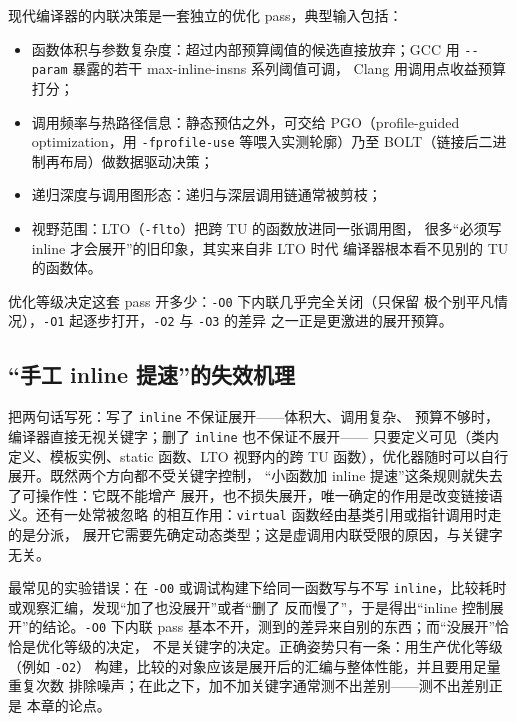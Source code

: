 \documentclass[12pt,a4paper,fontset=fandol]{ctexbook}
\newcommand{\Tp}[1]{\texttt{#1}}
\newcommand{\Opt}[1]{\texttt{-\/-#1}}
\begin{document}
现代编译器的内联决策是一套独立的优化 pass，典型输入包括：
\begin{itemize}
  \item 函数体积与参数复杂度：超过内部预算阈值的候选直接放弃；GCC
        用 \Opt{param} 暴露的若干 max-inline-insns 系列阈值可调，
        Clang 用调用点收益预算打分；
  \item 调用频率与热路径信息：静态预估之外，可交给 PGO（profile-guided
        optimization，用 \Tp{-fprofile-use} 等喂入实测轮廓）乃至
        BOLT（链接后二进制再布局）做数据驱动决策；
  \item 递归深度与调用图形态：递归与深层调用链通常被剪枝；
  \item 视野范围：LTO（\Tp{-flto}）把跨 TU 的函数放进同一张调用图，
        很多``必须写 inline 才会展开''的旧印象，其实来自非 LTO 时代
        编译器根本看不见别的 TU 的函数体。
\end{itemize}
优化等级决定这套 pass 开多少：\Tp{-O0} 下内联几乎完全关闭（只保留
极个别平凡情况），\Tp{-O1} 起逐步打开，\Tp{-O2} 与 \Tp{-O3} 的差异
之一正是更激进的展开预算。

\subsection{``手工 inline 提速''的失效机理}
\label{sec:ch08-failure}

把两句话写死：写了 \Tp{inline} 不保证展开——体积大、调用复杂、
预算不够时，编译器直接无视关键字；删了 \Tp{inline} 也不保证不展开——
只要定义可见（类内定义、模板实例、static 函数、LTO 视野内的跨 TU
函数），优化器随时可以自行展开。既然两个方向都不受关键字控制，
``小函数加 inline 提速''这条规则就失去了可操作性：它既不能增产
展开，也不损失展开，唯一确定的作用是改变链接语义。还有一处常被忽略
的相互作用：\Tp{virtual} 函数经由基类引用或指针调用时走的是分派，
展开它需要先确定动态类型；这是虚调用内联受限的原因，与关键字无关。

\begin{warning}[title={在 {\Tp{-O0}} 下测性能，再拿结果给 inline 定罪}]
最常见的实验错误：在 \Tp{-O0} 或调试构建下给同一函数写与不写
\Tp{inline}，比较耗时或观察汇编，发现``加了也没展开''或者``删了
反而慢了''，于是得出``inline 控制展开''的结论。\Tp{-O0} 下内联 pass
基本不开，测到的差异来自别的东西；而``没展开''恰恰是优化等级的决定，
不是关键字的决定。正确姿势只有一条：用生产优化等级（例如 \Tp{-O2}）
构建，比较的对象应该是展开后的汇编与整体性能，并且要用足量重复次数
排除噪声；在此之下，加不加关键字通常测不出差别——测不出差别正是
本章的论点。
\end{warning}
\end{document}
